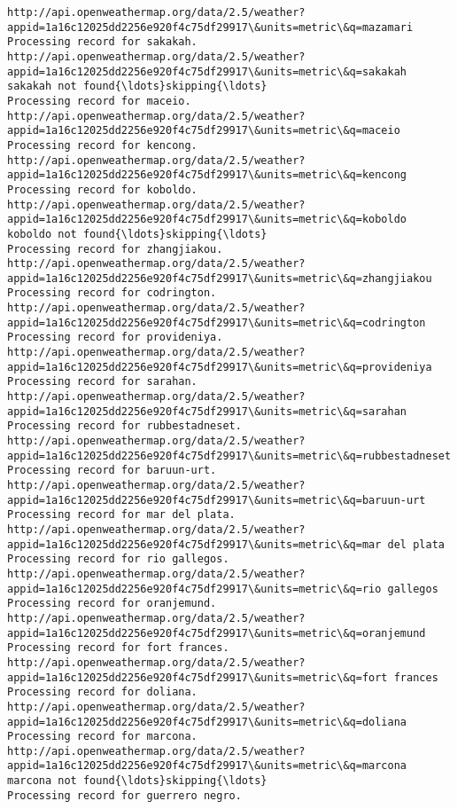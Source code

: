 \documentclass[11pt]{article}
\begin{document}
\begin{Verbatim}[commandchars=\\\{\}]
http://api.openweathermap.org/data/2.5/weather?appid=1a16c12025dd2256e920f4c75df29917\&units=metric\&q=mazamari
Processing record for sakakah.
http://api.openweathermap.org/data/2.5/weather?appid=1a16c12025dd2256e920f4c75df29917\&units=metric\&q=sakakah
sakakah not found{\ldots}skipping{\ldots}
Processing record for maceio.
http://api.openweathermap.org/data/2.5/weather?appid=1a16c12025dd2256e920f4c75df29917\&units=metric\&q=maceio
Processing record for kencong.
http://api.openweathermap.org/data/2.5/weather?appid=1a16c12025dd2256e920f4c75df29917\&units=metric\&q=kencong
Processing record for koboldo.
http://api.openweathermap.org/data/2.5/weather?appid=1a16c12025dd2256e920f4c75df29917\&units=metric\&q=koboldo
koboldo not found{\ldots}skipping{\ldots}
Processing record for zhangjiakou.
http://api.openweathermap.org/data/2.5/weather?appid=1a16c12025dd2256e920f4c75df29917\&units=metric\&q=zhangjiakou
Processing record for codrington.
http://api.openweathermap.org/data/2.5/weather?appid=1a16c12025dd2256e920f4c75df29917\&units=metric\&q=codrington
Processing record for provideniya.
http://api.openweathermap.org/data/2.5/weather?appid=1a16c12025dd2256e920f4c75df29917\&units=metric\&q=provideniya
Processing record for sarahan.
http://api.openweathermap.org/data/2.5/weather?appid=1a16c12025dd2256e920f4c75df29917\&units=metric\&q=sarahan
Processing record for rubbestadneset.
http://api.openweathermap.org/data/2.5/weather?appid=1a16c12025dd2256e920f4c75df29917\&units=metric\&q=rubbestadneset
Processing record for baruun-urt.
http://api.openweathermap.org/data/2.5/weather?appid=1a16c12025dd2256e920f4c75df29917\&units=metric\&q=baruun-urt
Processing record for mar del plata.
http://api.openweathermap.org/data/2.5/weather?appid=1a16c12025dd2256e920f4c75df29917\&units=metric\&q=mar del plata
Processing record for rio gallegos.
http://api.openweathermap.org/data/2.5/weather?appid=1a16c12025dd2256e920f4c75df29917\&units=metric\&q=rio gallegos
Processing record for oranjemund.
http://api.openweathermap.org/data/2.5/weather?appid=1a16c12025dd2256e920f4c75df29917\&units=metric\&q=oranjemund
Processing record for fort frances.
http://api.openweathermap.org/data/2.5/weather?appid=1a16c12025dd2256e920f4c75df29917\&units=metric\&q=fort frances
Processing record for doliana.
http://api.openweathermap.org/data/2.5/weather?appid=1a16c12025dd2256e920f4c75df29917\&units=metric\&q=doliana
Processing record for marcona.
http://api.openweathermap.org/data/2.5/weather?appid=1a16c12025dd2256e920f4c75df29917\&units=metric\&q=marcona
marcona not found{\ldots}skipping{\ldots}
Processing record for guerrero negro.

\end{Verbatim}
\end{document}
